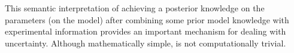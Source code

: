 This semantic interpretation of achieving a posterior knowledge on the parameters (on the model)
after combining some prior model knowledge with experimental information provides an important mechanism for dealing with uncertainty.
Although mathematically simple, is not computationally trivial. 

% 
% 
% 
% 
% 
% 
% 
% 
% 
